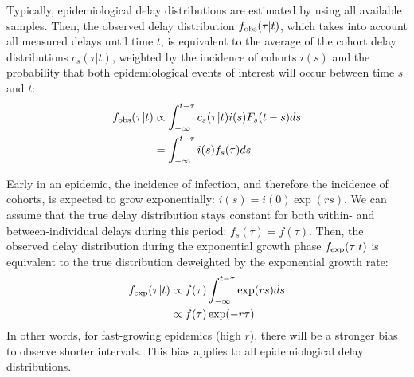 \documentclass[12pt]{article}
\begin{document}
Typically, epidemiological delay distributions are estimated by using all available samples.
Then, the observed delay distribution $f_{\tiny\textrm{obs}}(\tau|t)$, which takes into account all measured delays until time $t$, is equivalent to the average of the cohort delay distributions $c_s(\tau|t)$, weighted by the incidence of cohorts $i(s)$ and the probability that both epidemiological events of interest will occur between time $s$ and $t$:
\begin{equation}
\begin{aligned}
f_{\tiny\textrm{obs}}(\tau|t) &\propto \int_{-\infty}^{t-\tau} c_s(\tau|t) i(s) F_s(t-s) ds\\
&= \int_{-\infty}^{t-\tau} i(s) f_s(\tau) ds
\end{aligned}
\end{equation}

Early in an epidemic, the incidence of infection, and therefore the incidence of cohorts, is expected to grow exponentially: $i(s) = i(0) \exp(rs)$.
We can assume that the true delay distribution stays constant for both within- and between-individual delays during this period: $f_s(\tau) = f(\tau)$.
Then, the observed delay distribution during the exponential growth phase $f_{\tiny\textrm{exp}}(\tau|t)$ is equivalent to the true distribution deweighted by the exponential growth rate:
\begin{equation}
\begin{aligned}
f_{\tiny\textrm{exp}}(\tau|t) &\propto f(\tau) \int_{-\infty}^{t-\tau} \exp(rs) ds\\
&\propto f(\tau) \exp(-r\tau) \\
\end{aligned}
\end{equation}
In other words, for fast-growing epidemics (high $r$), there will be a stronger bias to observe shorter intervals.
This bias applies to all epidemiological delay distributions.
\end{document}

